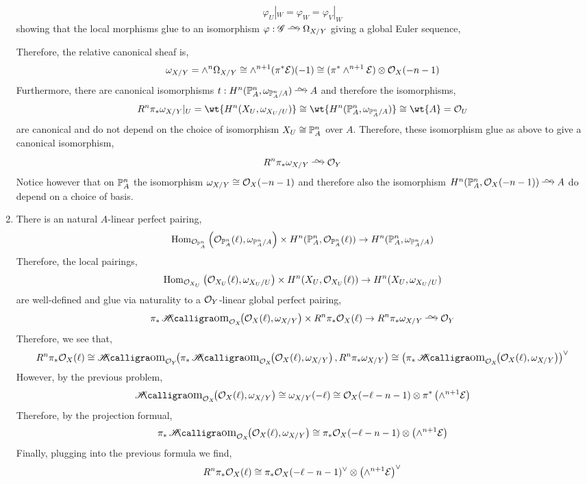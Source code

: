 \documentclass[12pt]{article}
\begin{document}
\begin{enumerate}
\[ \varphi_U |_W = \varphi_W = \varphi_V |_W \]
showing that the local morphisms glue to an isomorphism $\varphi : \G \iso \Omega_{X/Y}$ giving a global Euler sequence,
\begin{center}
\end{center}
Therefore, the relative canonical sheaf is,
\[ \omega_{X/Y} = \wedge^n \Omega_{X/Y} \cong \wedge^{n+1} (\pi^* \E)(-1) \cong (\pi^* \wedge^{n+1} \E) \ot \struct{X}(-n-1) \]
Furthermore, there are canonical isomorphisms $t : H^n(\P^n_A, \omega_{\P^n_A/A}) \iso A$ and therefore the isomorphisms,
\[ R^n \pi_* \omega_{X/Y} |_U = \wt{H^n(X_U, \omega_{X_U/U})} \cong \wt{H^n(\P^n_A, \omega_{\P^n_A/A})} \cong \wt{A} = \struct{U} \]
are canonical and do not depend on the choice of isomorphism $X_U \cong \P^n_A$ over $A$. Therefore, these isomorphism glue as above to give a canonical isomorphism,
\[ R^n \pi_* \omega_{X/Y} \iso \struct{Y} \]
Notice however that on $\P^n_A$ the isomorphism $\omega_{X/Y} \cong \struct{X}(-n-1)$ and therefore also the isomorphism $H^n(\P^n_A, \struct{X}(-n-1)) \iso A$ do depend on a choice of basis. 

\item There is an natural $A$-linear perfect pairing,
\[ \Hom{\struct{\P^n_A}}{\struct{\P^n_A}(\ell)}{\omega_{\P^n_A/A}} \times H^n(\P^n_A, \struct{\P^n_A}(\ell)) \to H^n(\P^n_A, \omega_{\P^n_A/A}) \]
Therefore, the local pairings,
\[ \Hom{\struct{X_U}}{\struct{X_U}(\ell)}{\omega_{X_U/U}} \times H^n(X_U, \struct{X_U}(\ell)) \to H^n(X_U, \omega_{X_U/U}) \]
are well-defined and glue via naturality to a $\struct{Y}$-linear global perfect pairing,
\[ \pi_* \shHom{\struct{X}}{\struct{X}(\ell)}{\omega_{X/Y}} \times R^n \pi_* \struct{X}(\ell) \to R^n \pi_* \omega_{X/Y} \iso \struct{Y} \]
Therefore, we see that,
\[ R^n \pi_* \struct{X}(\ell) \cong \shHom{\struct{Y}}{\pi_* \shHom{\struct{X}}{\struct{X}(\ell)}{\omega_{X/Y}}}{R^n \pi_* \omega_{X/Y}} \cong \left( \pi_* \shHom{\struct{X}}{\struct{X}(\ell)}{\omega_{X/Y}} \right)^\vee \]
However, by the previous problem,
\[ \shHom{\struct{X}}{\struct{X}(\ell)}{\omega_{X/Y}} \cong \omega_{X/Y}(-\ell) \cong \struct{X}(-\ell - n - 1) \ot \pi^* \left( \wedge^{n+1} \E \right)  \]
Therefore, by the projection formual,
\[ \pi_* \shHom{\struct{X}}{\struct{X}(\ell)}{\omega_{X/Y}} \cong \pi_* \struct{X}(-\ell - n - 1) \ot \left( \wedge^{n+1} \E \right) \]
Finally, plugging into the previous formula we find,
\[ R^n \pi_* \struct{X}(\ell) \cong \pi_* \struct{X}(-\ell - n - 1)^\vee \ot \left( \wedge^{n+1} \E \right)^\vee \]


\end{enumerate}
\end{document}
